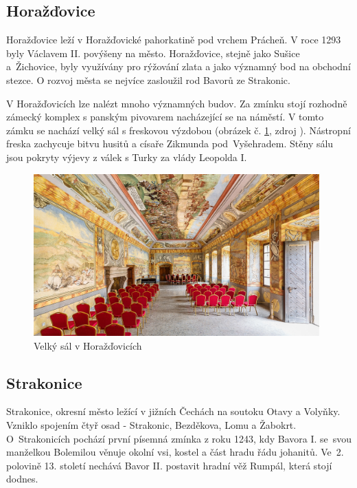 \documentclass[thesis=M,czech]{FITthesis}[2012/06/26]
\begin{document}
\subsection{Horažďovice}
Horažďovice leží v Horažďovické pahorkatině pod vrchem Prácheň. V roce 1293 byly Václavem II. povýšeny na město. Horažďovice, stejně jako Sušice a~Žichovice, byly využívány pro rýžování zlata a jako významný bod na obchodní stezce. O rozvoj města se nejvíce zasloužil rod Bavorů ze Strakonic. 

V Horažďovicích lze nalézt mnoho významných budov. Za zmínku stojí rozhodně zámecký komplex s panským pivovarem nacházející se na náměstí. V tomto zámku se nachází velký sál s freskovou výzdobou  (obrázek č. \ref{obrazek:hd}, zdroj \cite{hd}). Nástropní freska zachycuje bitvu husitů a císaře Zikmunda pod~Vyšehradem. Stěny sálu jsou pokryty výjevy z válek s Turky za vlády Leopolda I.  \cite{obce}\cite{hd}

\begin{figure}[h!]
	\centering
	\includegraphics[width=11cm]{pics/hd.jpg}
	\caption{Velký sál v Horažďovicích}
	\label{obrazek:hd}
\end{figure}



\subsection{Strakonice}
Strakonice, okresní město ležící v jižních Čechách na soutoku Otavy a Volyňky. Vzniklo spojením čtyř osad - Strakonic, Bezděkova, Lomu a Žabokrt. O~Strakonicích pochází první písemná zmínka z roku 1243, kdy Bavora I. se~svou manželkou Bolemilou věnuje okolní vsi, kostel a část hradu řádu johanitů. Ve~2. polovině 13. století nechává Bavor II. postavit hradní věž Rumpál, která stojí dodnes. 
\end{document}
